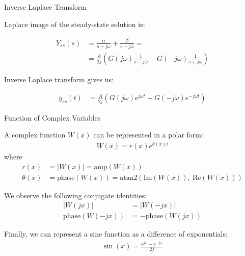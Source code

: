 \documentclass{beamer}
\begin{document}
\begin{frame}{Inverse Laplace Transform}
	\begin{flushleft}
		
		Laplace image of the steady-state solution is:
		
		\begin{align}
			 Y_{ss}(s) &= \frac{\alpha}{s + j\omega} + \frac{\beta}{s - j\omega} =
			 \\
			  &=
			 \frac{A}{2j}
			 \left(
			 G(j\omega)\frac{1}{s - j\omega} -G(-j\omega) \frac{1}{s + j\omega}
			 \right)
		\end{align}
		
		Inverse Laplace transform gives us:
		
		\begin{align}
			y_{ss}(t) &= 
			\frac{A}{2j}
			\left(
			G(j\omega)e^{ j\omega t} - G(-j\omega) e^{- j\omega t}
			\right)
		\end{align}
		
		
	\end{flushleft}
\end{frame}




\begin{frame}{Function of Complex Variables}
	\begin{flushleft}
		
		A complex function $W(x)$ can be represented in a polar form:
		\begin{align}
			W(x) = r(x) e^{\theta(x) i}
		\end{align}
		where 
		\begin{align}
			r(x) &= |W(x)| = \text{amp}(W(x))
			\\
			\theta(x) &= \text{phase}(W(x)) = \text{atan2}( \text{Im}(W(x)), \ \text{Re}(W(x))  )
		\end{align}
		
		We observe the following conjugate identities:
		\begin{align}
			|W(jx)| &= |W(-jx)|
			\\
			\text{phase}(W(-jx)) &= -\text{phase}(W(jx))
		\end{align}
		
		\bigskip
		
		Finally, we can represent a sine function as a difference of exponentials:
		\begin{align}
			\sin(x) = \frac{e^{jx}-e^{-jx}}{2j}
		\end{align}
		
	\end{flushleft}
\end{frame}
\end{document}
